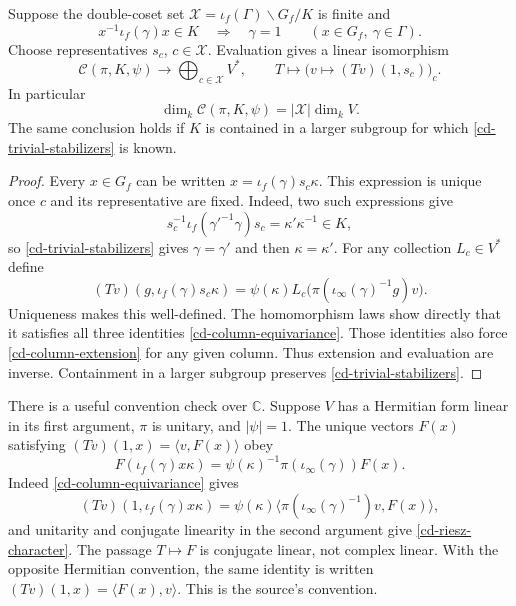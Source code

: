 \begin{proposition}\label{cd-column-decomposition}
Suppose the double-coset set
$\mathcal X=\iota_f(\Gamma)\backslash G_f/K$ is finite and
\begin{equation}\label{cd-trivial-stabilizers}
     x^{-1}\iota_f(\gamma)x\in K\quad\Longrightarrow\quad\gamma=1
                            \qquad(x\in G_f,\ \gamma\in\Gamma).
\end{equation}
Choose representatives $s_c$, $c\in\mathcal X$. Evaluation gives
a linear isomorphism
\[
 \mathcal C(\pi,K,\psi)\longrightarrow\bigoplus_{c\in\mathcal X}V^*,
 \qquad T\longmapsto\bigl(v\mapsto(Tv)(1,s_c)\bigr)_c.
\]
In particular
\begin{equation}\label{cd-column-rank}
                  \dim_k\mathcal C(\pi,K,\psi)
                               =|\mathcal X|\dim_k V.
\end{equation}
The same conclusion holds if $K$ is contained in a larger subgroup
for which \eqref{cd-trivial-stabilizers} is known.
\end{proposition}
\begin{proof}
Every $x\in G_f$ can be written
$x=\iota_f(\gamma)s_c\kappa$. This expression is unique once
$c$ and its representative are fixed. Indeed, two such expressions
give
\[
 s_c^{-1}\iota_f(\gamma'^{-1}\gamma)s_c=\kappa'\kappa^{-1}\in K,
\]
so \eqref{cd-trivial-stabilizers} gives $\gamma=\gamma'$ and
then $\kappa=\kappa'$.
For any collection $L_c\in V^*$ define
\begin{equation}\label{cd-column-extension}
       (Tv)(g,\iota_f(\gamma)s_c\kappa)
          =\psi(\kappa)L_c\bigl(\pi(\iota_\infty(\gamma)^{-1}g)v\bigr).
\end{equation}
Uniqueness makes this well-defined. The homomorphism laws show
directly that it satisfies all three identities
\eqref{cd-column-equivariance}. Those identities also force
\eqref{cd-column-extension} for any given column. Thus extension
and evaluation are inverse. Containment in a larger subgroup
preserves \eqref{cd-trivial-stabilizers}.
\end{proof}

There is a useful convention check over $\mathbb C$. Suppose $V$
has a Hermitian form linear in its first argument, $\pi$ is
unitary, and $|\psi|=1$. The unique vectors $F(x)$ satisfying
$(Tv)(1,x)=\langle v,F(x)\rangle$ obey
\begin{equation}\label{cd-riesz-character}
 F(\iota_f(\gamma)x\kappa)
            =\psi(\kappa)^{-1}\pi(\iota_\infty(\gamma))F(x).
\end{equation}
Indeed \eqref{cd-column-equivariance} gives
\[
 (Tv)(1,\iota_f(\gamma)x\kappa)
     =\psi(\kappa)\langle\pi(\iota_\infty(\gamma)^{-1})v,F(x)\rangle,
\]
and unitarity and conjugate linearity in the second argument give
\eqref{cd-riesz-character}. The passage $T\mapsto F$ is
conjugate linear, not complex linear. With the opposite Hermitian
convention, the same identity is written
$(Tv)(1,x)=\langle F(x),v\rangle$. This is the source's convention.

